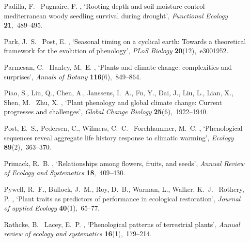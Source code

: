 \documentclass[11pt]{article}
\begin{document}
\begin{thebibliography}{xx}
Padilla, F. \harvardand\ Pugnaire, F.  \harvardyearright ,
  `Rooting depth and soil moisture control mediterranean woody seedling
  survival during drought', {\em Functional Ecology} {\bf 21},~489--495.

Park, J.~S. \harvardand\ Post, E.  \harvardyearright ,
  `Seasonal timing on a cyclical earth: Towards a theoretical framework for the
  evolution of phenology', {\em PLoS Biology} {\bf 20}(12),~e3001952.

Parmesan, C. \harvardand\ Hanley, M.~E.  \harvardyearright
  , `Plants and climate change: complexities and surprises', {\em Annals of
  Botany} {\bf 116}(6),~849--864.

Piao, S., Liu, Q., Chen, A., Janssens, I.~A., Fu, Y., Dai, J., Liu, L., Lian,
  X., Shen, M. \harvardand\ Zhu, X.  \harvardyearright ,
  `Plant phenology and global climate change: Current progresses and
  challenges', {\em Global Change Biology} {\bf 25}(6),~1922--1940.

Post, E.~S., Pedersen, C., Wilmers, C.~C. \harvardand\ Forchhammer, M.~C.
  \harvardyearleft 2008\harvardyearright , `Phenological sequences reveal
  aggregate life history response to climatic warming', {\em Ecology} {\bf
  89}(2),~363--370.

Primack, R.~B.  \harvardyearright , `Relationships among
  flowers, fruits, and seeds', {\em Annual Review of Ecology and Systematics}
  {\bf 18},~409--430.

Pywell, R.~F., Bullock, J.~M., Roy, D.~B., Warman, L., Walker, K.~J.
  \harvardand\ Rothery, P.  \harvardyearright , `Plant
  traits as predictors of performance in ecological restoration', {\em Journal
  of applied Ecology} {\bf 40}(1),~65--77.

Rathcke, B. \harvardand\ Lacey, E.~P.  \harvardyearright ,
  `Phenological patterns of terrestrial plants', {\em Annual review of ecology
  and systematics} {\bf 16}(1),~179--214.


\end{thebibliography}
\end{document}
